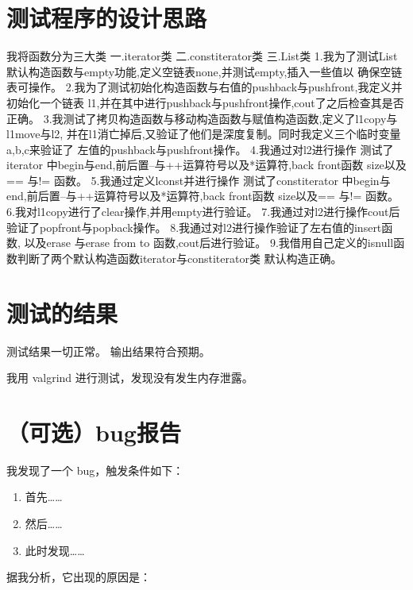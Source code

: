 \documentclass[UTF8]{ctexart}
\begin{document}
\pagestyle{fancy}
\fancyhead{}

\section{测试程序的设计思路}

我将函数分为三大类
\newline
一.iterator类
\newline 
二.constiterator类
\newline
三.List类
\newline
1.我为了测试List默认构造函数与empty功能,定义空链表none,并测试empty,插入一些值以
确保空链表可操作。
\newline
2.我为了测试初始化构造函数与右值的pushback与pushfront,我定义并初始化一个链表
l1,并在其中进行pushback与pushfront操作,cout了之后检查其是否正确。
\newline
3.我测试了拷贝构造函数与移动构造函数与赋值构造函数,定义了l1copy与l1move与l2,
并在l1消亡掉后,又验证了他们是深度复制。同时我定义三个临时变量a,b,c来验证了
左值的pushback与pushfront操作。
\newline
4.我通过对l2进行操作
测试了iterator 中begin与end,前后置--与++运算符号以及*运算符,back front函数
size以及== 与!= 函数。
\newline
5.我通过定义lconst并进行操作
测试了constiterator 中begin与end,前后置--与++运算符号以及*运算符,back front函数
size以及== 与!= 函数。
\newline
6.我对l1copy进行了clear操作,并用empty进行验证。
\newline
7.我通过对l2进行操作cout后
验证了popfront与popback操作。
\newline
8.我通过对l2进行操作验证了左右值的insert函数,
以及erase 与erase from to 函数,cout后进行验证。
\newline
9.我借用自己定义的isnull函数判断了两个默认构造函数iterator与constiterator类
默认构造正确。

\section{测试的结果}

测试结果一切正常。
输出结果符合预期。


我用 valgrind 进行测试，发现没有发生内存泄露。

\section{（可选）bug报告}

我发现了一个 bug，触发条件如下：

\begin{enumerate}
    \item 首先……
    \item 然后……
    \item 此时发现……
\end{enumerate}

据我分析，它出现的原因是：
\end{document}
